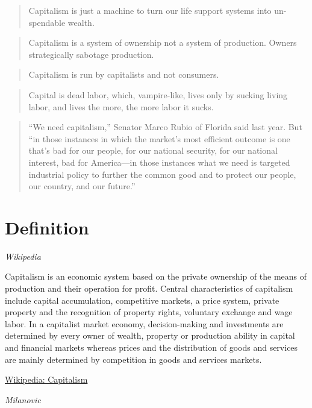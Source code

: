 \documentclass[
]{book}
\begin{document}
\begin{quote}
Capitalism is just a machine to turn our life support systems into un-spendable wealth.
\end{quote}

\begin{quote}
Capitalism is a system of ownership not a system of production. Owners strategically sabotage production.
\end{quote}

\begin{quote}
Capitalism is run by capitalists and not consumers.
\end{quote}

\begin{quote}
Capital is dead labor, which, vampire-like, lives only by sucking living labor, and lives the more, the more labor it sucks.
\end{quote}

\begin{quote}
``We need capitalism,'' Senator Marco Rubio of Florida said last year. But ``in those instances in which the market's most efficient outcome is one that's bad for our people, for our national security, for our national interest, bad for America---in those instances what we need is targeted industrial policy to further the common good and to protect our people, our country, and our future.''
\end{quote}

\hypertarget{definition}{%
\section{Definition}\label{definition}}

\emph{Wikipedia}

Capitalism is an economic system based on the private ownership of the means of production and their operation for profit.
Central characteristics of capitalism include capital accumulation, competitive markets, a price system, private property and the recognition of property rights, voluntary exchange and wage labor.
In a capitalist market economy, decision-making and investments are determined by every owner of wealth, property or production ability in capital and financial markets whereas prices and the distribution of goods and services are mainly determined by competition in goods and services markets.

\href{https://en.wikipedia.org/wiki/Capitalism}{Wikipedia: Capitalism}

\emph{Milanovic}
\end{document}
